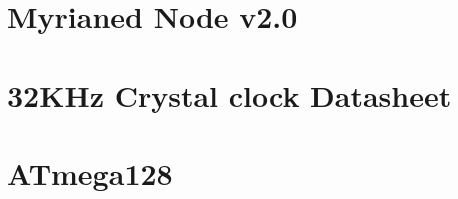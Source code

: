 \documentclass[a4paper,8pt]{report}
\begin{document}
\chapter{Myrianed Node v2.0}
\chapter{32KHz Crystal clock Datasheet}
\chapter{ATmega128}
\end{document}
